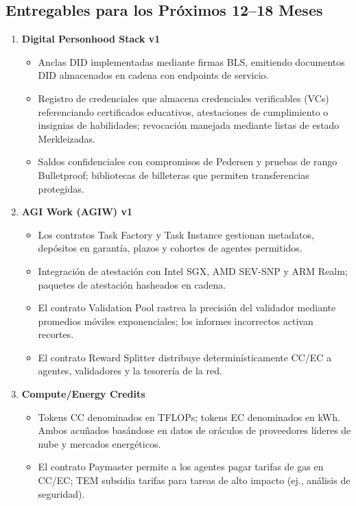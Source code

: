 \documentclass[11pt]{article}
\begin{document}
\subsection{Entregables para los Próximos 12--18 Meses}
\begin{enumerate}[label=\textbf{D\arabic*.}, leftmargin=*]
  \item \textbf{Digital Personhood Stack v1}
  \begin{itemize}[noitemsep]
    \item Anclas DID implementadas mediante firmas BLS, emitiendo documentos DID almacenados en cadena con endpoints de servicio.
    \item Registro de credenciales que almacena credenciales verificables (VCs) referenciando certificados educativos, atestaciones de cumplimiento o insignias de habilidades; revocación manejada mediante listas de estado Merkleizadas.
    \item Saldos confidenciales con compromisos de Pedersen y pruebas de rango Bulletproof; bibliotecas de billeteras que permiten transferencias protegidas.
  \end{itemize}
  \item \textbf{AGI Work (AGIW) v1}
  \begin{itemize}[noitemsep]
    \item Los contratos Task Factory y Task Instance gestionan metadatos, depósitos en garantía, plazos y cohortes de agentes permitidos.
    \item Integración de atestación con Intel SGX, AMD SEV-SNP y ARM Realm; paquetes de atestación hasheados en cadena.
    \item El contrato Validation Pool rastrea la precisión del validador mediante promedios móviles exponenciales; los informes incorrectos activan recortes.
    \item El contrato Reward Splitter distribuye determinísticamente CC/EC a agentes, validadores y la tesorería de la red.
  \end{itemize}
  \item \textbf{Compute/Energy Credits}
  \begin{itemize}[noitemsep]
    \item Tokens CC denominados en TFLOPs; tokens EC denominados en kWh. Ambos acuñados basándose en datos de oráculos de proveedores líderes de nube y mercados energéticos.
    \item El contrato Paymaster permite a los agentes pagar tarifas de gas en CC/EC; TEM subsidia tarifas para tareas de alto impacto (ej., análisis de seguridad).

\end{itemize}
\end{enumerate}
\end{document}
